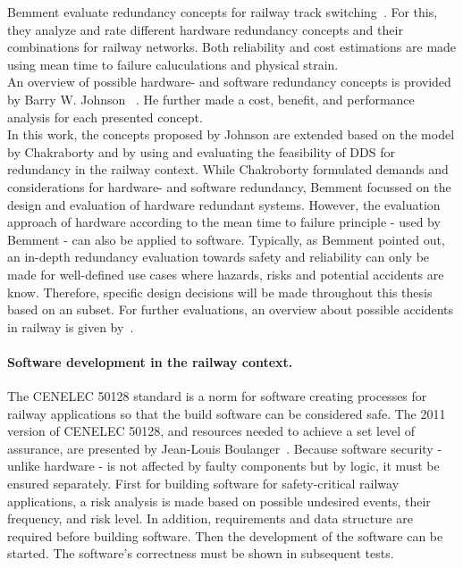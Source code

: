 Bemment \etal evaluate redundancy concepts for railway track switching~\cite{BemmentEvaluationOfRedundancy}.
For this, they analyze and rate different hardware redundancy concepts and their combinations for railway networks.
Both reliability and cost estimations are made using mean time to failure caluculations and physical strain.
\\

An overview of possible hardware- and software redundancy concepts is provided by Barry W. Johnson \etal~\cite{BarryFaultToleranceAnalysis}.
He further made a cost, benefit, and performance analysis for each presented concept.
\\

In this work, the concepts proposed by Johnson \etal are extended based on the model by Chakraborty and by using and evaluating the feasibility of \gls*{DDS} for redundancy in the railway context.
While Chakroborty formulated demands and considerations for hardware- and software redundancy, Bemment \etal focussed on the design and evaluation of hardware redundant systems.
However, the evaluation approach of hardware according to the mean time to failure principle - used by Bemment \etal - can also be applied to software.
Typically, as Bemment \etal pointed out, an in-depth redundancy evaluation towards safety and reliability can only be made for well-defined use cases where hazards, risks and potential accidents are know.
Therefore, specific design decisions will be made throughout this thesis based on an  subset.
For further evaluations, an overview about possible accidents in railway is given by~\cite{ERTMSRailwayAccidents}.


\paragraph{Software development in the railway context.}
The CENELEC 50128 standard is a norm for software creating processes for railway applications so that the build software can be considered safe.
The 2011 version of CENELEC 50128, and resources needed to achieve a set level of assurance, are presented by Jean-Louis Boulanger~\cite{BoulangerStandards}.
Because software security - unlike hardware - is not affected by faulty components but by logic, it must be ensured separately.
First for building software for safety-critical railway applications, a risk analysis is made based on possible undesired events, their frequency, and risk level.
In addition, requirements and data structure are required before building software.
Then the development of the software can be started.
The software's correctness must be shown in subsequent tests.
\\

